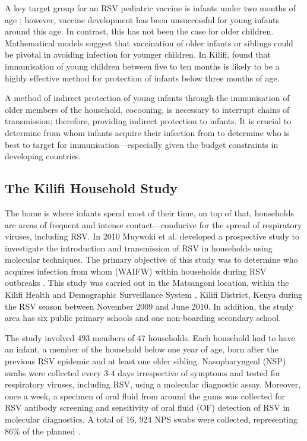 \documentclass[10pt, a4paper]{article}
\begin{document}
A key target group for an RSV pediatric vaccine is infants under two months of
age \cite{nokesNewStrategiesControl2008}; however, vaccine development has been
unsuccessful for young infants around this age.
In contrast, this has not been the case for older children. Mathematical models
\cite{whiteTransmissionDynamicsGroups2005,whiteUnderstandingTransmissionDynamics2007}
suggest that vaccination of older infants or siblings
could be pivotal in avoiding infection for younger children.
In Kilifi, \cite{kinyanjuiVaccineInducedHerd2015,munywokiInfluenceAgeSeverity2015}
found that immunisation of young children between five to ten months is likely
to be a highly effective method for protection of infants below three months of
age.

A method of indirect protection of young infants through the immunisation of
older members of the household, cocooning, is necessary to interrupt chains of
transmission; therefore, providing indirect protection to infants.
It is crucial to determine from whom infants acquire their infection from to
determine who is best to target for immunisation—especially given the budget
constraints in developing countries.

\newpage

\subsection{The Kilifi Household Study}
\label{sec:org31e07d4}
The home is where infants spend most of their time, on top of that, households
are areas of frequent and intense contact—conducive for the spread of
respiratory viruses, including RSV. In 2010 Muywoki et al. developed a
prospective study to investigate the introduction and transmission of RSV in
households using molecular techniques. The primary objective of this study was
to determine who acquires infection from whom (WAIFW) within households during
RSV outbreaks \cite{munywokiTransmissionRespiratorySyncytial2013}.
This study was carried out in the Matsangoni location, within the Kilifi Health
and Demographic Surveillance System \cite{scottProfileKilifiHealth2012},
Kilifi District, Kenya during the RSV season between November 2009 and
June 2010. In addition, the study area has six public primary schools and one
non-boarding secondary school.

The study involved 493 members of 47 households. Each household had to have an
infant, a member of the household below one year of age, born after the previous
RSV epidemic and at least one elder sibling. Nasopharyngeal (NSP) swabs were
collected every 3-4 days irrespective of symptoms and tested for respiratory
viruses, including RSV, using a molecular diagnostic assay. Moreover, once a
week, a specimen of oral fluid from around the gums was collected for RSV
antibody screening and sensitivity of oral fluid (OF) detection of RSV in
molecular diagnostics.
A total of 16, 924 NPS swabs were collected, representing 86\% of the planned
\cite{munywokiTransmissionRespiratorySyncytial2013}.
\end{document}
